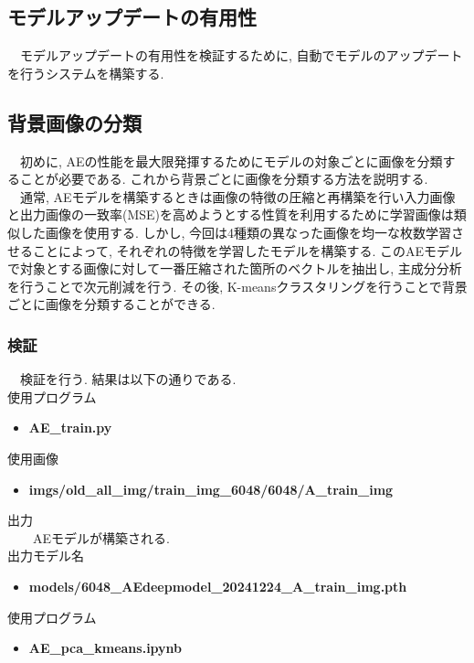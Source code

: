 \documentclass[a4paper, 12pt]{report}
\begin{document}
\subsection{モデルアップデートの有用性}
　モデルアップデートの有用性を検証するために, 自動でモデルのアップデートを行うシステムを構築する. 

\subsection{背景画像の分類}
　初めに, AEの性能を最大限発揮するためにモデルの対象ごとに画像を分類することが必要である. これから背景ごとに画像を分類する方法を説明する. 
\\　通常, AEモデルを構築するときは画像の特徴の圧縮と再構築を行い入力画像と出力画像の一致率(MSE)を高めようとする性質を利用するために学習画像は類似した画像を使用する. 
しかし, 今回は4種類の異なった画像を均一な枚数学習させることによって, それぞれの特徴を学習したモデルを構築する. 
このAEモデルで対象とする画像に対して一番圧縮された箇所のベクトルを抽出し, 主成分分析を行うことで次元削減を行う. 
その後, K-meansクラスタリングを行うことで背景ごとに画像を分類することができる. 

\subsubsection{検証}
　検証を行う. 結果は以下の通りである. \\

使用プログラム
\begin{itemize}
    \item \textbf{AE\_train.py}
\end{itemize}

使用画像
\begin{itemize}
    \item \textbf{imgs/old\_all\_img/train\_img\_6048/6048/A\_train\_img}
\end{itemize}

出力\\
　　AEモデルが構築される.\\

出力モデル名
\begin{itemize}
    \item \textbf{models/6048\_AEdeepmodel\_20241224\_A\_train\_img.pth}
\end{itemize}

使用プログラム
\begin{itemize}
    \item \textbf{AE\_pca\_kmeans.ipynb}
\end{itemize}
\end{document}
